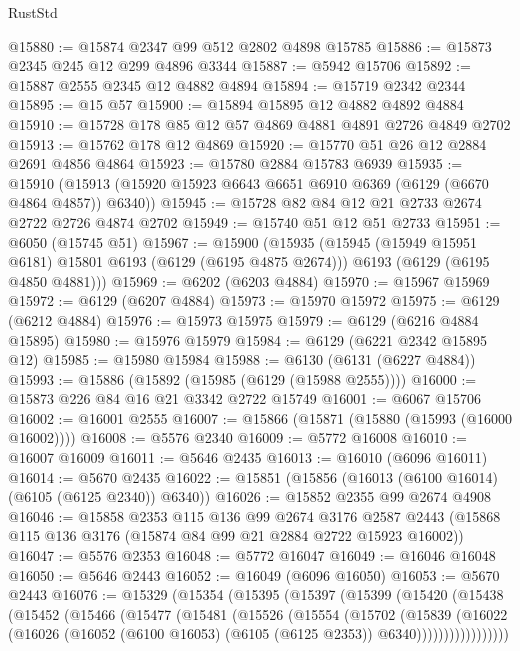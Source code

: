 \begin{lexlean}{RustStd}
\begin{coremodule}
@15880 := @15874 @2347 @99 @512 @2802 @4898 @15785
@15886 := @15873 @2345 @245 @12 @299 @4896 @3344
@15887 := @5942 @15706
@15892 := @15887 @2555 @2345 @12 @4882 @4894
@15894 := @15719 @2342 @2344
@15895 := @15 @57
@15900 := @15894 @15895 @12 @4882 @4892 @4884
@15910 := @15728 @178 @85 @12 @57 @4869 @4881 @4891 @2726 @4849 @2702
@15913 := @15762 @178 @12 @4869
@15920 := @15770 @51 @26 @12 @2884 @2691 @4856 @4864
@15923 := @15780 @2884 @15783 @6939
@15935 := @15910 (@15913 (@15920 @15923 @6643 @6651 @6910 @6369 (@6129 (@6670 @4864 @4857)) @6340))
@15945 := @15728 @82 @84 @12 @21 @2733 @2674 @2722 @2726 @4874 @2702
@15949 := @15740 @51 @12 @51 @2733
@15951 := @6050 (@15745 @51)
@15967 := @15900
    (@15935
      (@15945 (@15949 @15951 @6181) @15801 @6193 (@6129 (@6195 @4875 @2674)))
      @6193
      (@6129 (@6195 @4850 @4881)))
@15969 := @6202 (@6203 @4884)
@15970 := @15967 @15969
@15972 := @6129 (@6207 @4884)
@15973 := @15970 @15972
@15975 := @6129 (@6212 @4884)
@15976 := @15973 @15975
@15979 := @6129 (@6216 @4884 @15895)
@15980 := @15976 @15979
@15984 := @6129 (@6221 @2342 @15895 @12)
@15985 := @15980 @15984
@15988 := @6130 (@6131 (@6227 @4884))
@15993 := @15886 (@15892 (@15985 (@6129 (@15988 @2555))))
@16000 := @15873 @226 @84 @16 @21 @3342 @2722 @15749
@16001 := @6067 @15706
@16002 := @16001 @2555
@16007 := @15866 (@15871 (@15880 (@15993 (@16000 @16002))))
@16008 := @5576 @2340
@16009 := @5772 @16008
@16010 := @16007 @16009
@16011 := @5646 @2435
@16013 := @16010 (@6096 @16011)
@16014 := @5670 @2435
@16022 := @15851 (@15856 (@16013 (@6100 @16014) (@6105 (@6125 @2340)) @6340))
@16026 := @15852 @2355 @99 @2674 @4908
@16046 := @15858
    @2353
    @115
    @136
    @99
    @2674
    @3176
    @2587
    @2443
    (@15868 @115 @136 @3176 (@15874 @84 @99 @21 @2884 @2722 @15923 @16002))
@16047 := @5576 @2353
@16048 := @5772 @16047
@16049 := @16046 @16048
@16050 := @5646 @2443
@16052 := @16049 (@6096 @16050)
@16053 := @5670 @2443
@16076 := @15329
    (@15354
      (@15395
        (@15397
          (@15399
            (@15420
              (@15438
                (@15452
                  (@15466
                    (@15477
                      (@15481
                        (@15526
                          (@15554
                            (@15702
                              (@15839
                                (@16022
                                  (@16026
                                    (@16052
                                      (@6100 @16053)
                                      (@6105 (@6125 @2353))
                                      @6340)))))))))))))))))

\end{coremodule}
\end{lexlean}
